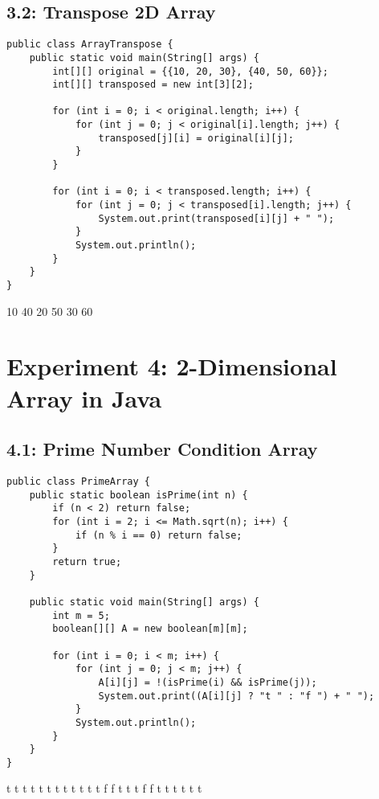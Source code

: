 \documentclass[a4paper,12pt]{article}
\begin{document}
\clearpage
\subsection{3.2: Transpose 2D Array}
\begin{samepage}
\begin{lstlisting}[caption={ArrayTranspose.java}]
public class ArrayTranspose {
    public static void main(String[] args) {
        int[][] original = {{10, 20, 30}, {40, 50, 60}};
        int[][] transposed = new int[3][2];
        
        for (int i = 0; i < original.length; i++) {
            for (int j = 0; j < original[i].length; j++) {
                transposed[j][i] = original[i][j];
            }
        }
        
        for (int i = 0; i < transposed.length; i++) {
            for (int j = 0; j < transposed[i].length; j++) {
                System.out.print(transposed[i][j] + " ");
            }
            System.out.println();
        }
    }
}
\end{lstlisting}

\begin{outputlisting}
10 40 
20 50 
30 60 
\end{outputlisting}
\end{samepage}

\section{Experiment 4: 2-Dimensional Array in Java}

\clearpage
\subsection{4.1: Prime Number Condition Array}
\begin{samepage}
\begin{lstlisting}[caption={PrimeArray.java}]
public class PrimeArray {
    public static boolean isPrime(int n) {
        if (n < 2) return false;
        for (int i = 2; i <= Math.sqrt(n); i++) {
            if (n % i == 0) return false;
        }
        return true;
    }
    
    public static void main(String[] args) {
        int m = 5;
        boolean[][] A = new boolean[m][m];
        
        for (int i = 0; i < m; i++) {
            for (int j = 0; j < m; j++) {
                A[i][j] = !(isPrime(i) && isPrime(j));
                System.out.print((A[i][j] ? "t " : "f ") + " ");
            }
            System.out.println();
        }
    }
}
\end{lstlisting}

\begin{outputlisting}
t t t t t 
t t t t t 
t t f f t 
t t f f t 
t t t t t 
\end{outputlisting}
\end{samepage}
\end{document}
